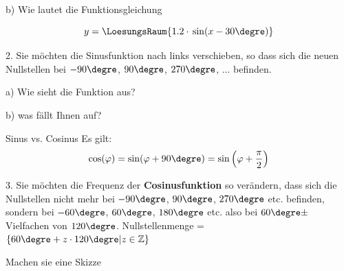 b) Wie lautet die Funktionsgleichung

$$y = \LoesungsRaum{1.2 \cdot{} \sin(x - 30\degre)}$$
\newpage


2. Sie möchten die Sinusfunktion nach links verschieben, so dass sich die neuen Nullstellen bei
$-90\degre$, $90\degre$, $270\degre$, ... befinden.

a) Wie sieht die Funktion aus?


b) was fällt Ihnen auf?

\begin{gesetz}{Sinus vs. Cosinus}{}
  Es gilt: $$\cos(\varphi)=\sin(\varphi+90\degre)=\sin\left(\varphi + \frac\pi2\right)$$
\end{gesetz}
\newpage

3. Sie möchten die Frequenz der \textbf{Cosinusfunktion} so verändern, dass sich die
Nullstellen nicht mehr bei $-90\degre$, $90\degre$, $270\degre$
etc. befinden, sondern bei $-60\degre$, $60\degre$, $180\degre$
etc. also bei $60\degre \pm$ Vielfachen von
$120\degre$. Nullstellenmenge = $\{60\degre+z\cdot{}120\degre|
z\in\mathbb{Z}\}$

Machen sie eine Skizze

\renewcommand\bbwFunctionColour{gray!30}


